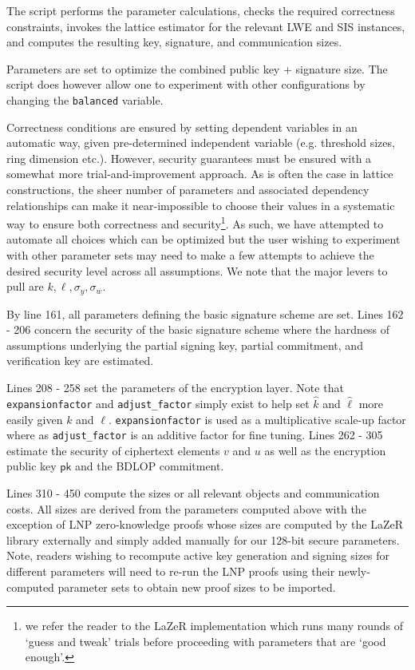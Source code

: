 \documentclass[nonacm,sigconf]{acmart}
\begin{document}
\begin{compactitem}
\begin{asparadesc}
    The script performs the parameter calculations, checks the required correctness constraints, invokes the lattice estimator for the relevant LWE and SIS instances, and computes the resulting key, signature, and communication sizes.

    Parameters are set to optimize the combined public key $+$ signature size. The script does however allow one to experiment with other configurations by changing the \texttt{balanced} variable.

    Correctness conditions are ensured by setting dependent variables in an automatic way, given pre-determined independent variable (e.g. threshold sizes, ring dimension etc.). However, security guarantees must be ensured with a somewhat more trial-and-improvement approach. As is often the case in lattice constructions, the sheer number of parameters and associated dependency relationships can make it near-impossible to choose their values in a systematic way to ensure both correctness and security\footnote{we refer the reader to the LaZeR implementation which runs many rounds of `guess and tweak' trials before proceeding with parameters that are `good enough'.}. As such, we have attempted to automate all choices which can be optimized but the user wishing to experiment with other parameter sets may need to make a few attempts to achieve the desired security level across all assumptions. We note that the major levers to pull are $k, \ell, \sigma_y, \sigma_w$.

     By line 161, all parameters defining the basic signature scheme are set.  Lines 162 - 206 concern the security of the basic signature scheme where the hardness of assumptions underlying the partial signing key, partial commitment, and verification key are estimated.

     Lines 208 - 258 set the parameters of the encryption layer. Note that \texttt{expansionfactor} and \texttt{adjust\_factor} simply exist to help set $\hat{k}$ and $\hat{\ell}$ more easily given $k$ and $\ell$. \texttt{expansionfactor} is used as a multiplicative scale-up factor where as \texttt{adjust\_factor} is an additive factor for fine tuning. Lines 262 - 305 estimate the security of ciphertext elements $v$ and $u$ as well as the encryption public key $\mathsf{pk}$ and the BDLOP commitment.

     Lines 310 - 450 compute the sizes or all relevant objects and communication costs. All sizes are derived from the parameters computed above with the exception of LNP zero-knowledge proofs whose sizes are computed by the LaZeR library externally and simply added manually for our 128-bit secure parameters. Note, readers wishing to recompute active key generation and signing sizes for different parameters will need to re-run the LNP proofs using their newly-computed parameter sets to obtain new proof sizes to be imported.




\end{asparadesc}
\end{compactitem}
\end{document}
